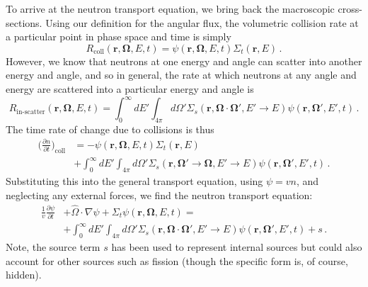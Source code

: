 To arrive at the neutron transport equation, we bring back the macroscopic cross-sections.  Using our definition for the angular flux, the volumetric collision rate at a particular point in phase space and time is simply
\begin{equation}
 R_{\text{coll}}(\mathbf{r},\mathbf{\Omega},E,t) = \psi(\mathbf{r},\mathbf{\Omega},E,t) \Sigma_t(\mathbf{r},E) \, .
\end{equation}
However, we know that neutrons at one energy and angle can scatter into another energy and angle, and so in general, the rate at which neutrons at any angle and energy are scattered into a particular energy and angle is
\begin{equation}
 R_{\text{in-scatter}}(\mathbf{r},\mathbf{\Omega},E,t) = \int^{\infty}_{0} dE' \int_{4\pi} d\Omega' \Sigma_s(\mathbf{r},\mathbf{\Omega}\cdot\mathbf{\Omega}',E'\to E)\psi(\mathbf{r},\mathbf{\Omega'},E',t) \, .
\end{equation}
The time rate of change due to collisions is thus
\begin{equation}
\begin{split}
 \Big( \frac{\partial n}{\partial t} \Big )_{\mathrm{coll}} &= -\psi(\mathbf{r},\mathbf{\Omega},E,t) \Sigma_t(\mathbf{r},E)  \\
  &+ \int^{\infty}_{0} dE' \int_{4\pi} d\Omega' \Sigma_s(\mathbf{r},\mathbf{\Omega}'\to \mathbf{\Omega},E'\to E)\psi(\mathbf{r},\mathbf{\Omega'},E',t) \, .
\end{split}
\end{equation}
Substituting this into the general transport equation, using $\psi = vn$, and neglecting any external forces, we find the neutron transport equation:
\begin{equation}
  \begin{split}
     \frac{1}{v}\frac{\partial \psi}{\partial t} &+ \hat{\Omega} \cdot \nabla \psi + \Sigma_t \psi(\mathbf{r},\mathbf{\Omega},E,t) = \\
           &+ \int^{\infty}_{0} dE' \int_{4\pi} d\Omega' \Sigma_s(\mathbf{r},\mathbf{\Omega}\cdot\mathbf{\Omega}',E'\to E)\psi(\mathbf{r},\mathbf{\Omega'},E',t) +s \, .
  \end{split}
  \label{eq:neutrontransport}
\end{equation}
Note, the source term $s$ has been used to represent internal sources but could also account for other sources such as fission (though the specific form is, of course, hidden).

